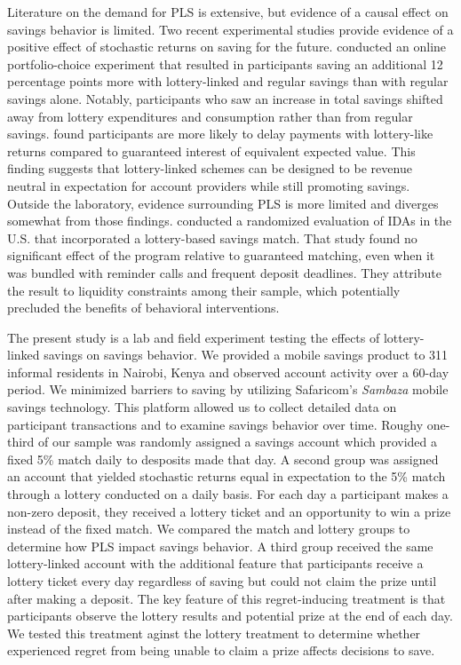 \documentclass[11pt]{article}
\begin{document}
	Literature on the demand for PLS is extensive, but evidence of a causal effect on savings behavior is limited. Two recent experimental studies provide evidence of a positive effect of stochastic returns on saving for the future.  conducted an online portfolio-choice experiment that resulted in participants saving an additional 12 percentage points more with lottery-linked and regular savings than with regular savings alone. Notably, participants who saw an increase in total savings shifted away from lottery expenditures and consumption rather than from regular savings.  found participants are more likely to delay payments with lottery-like returns compared to guaranteed interest of equivalent expected value. This finding suggests that lottery-linked schemes can be designed to be revenue neutral in expectation for account providers while still promoting savings. Outside the laboratory, evidence surrounding PLS is more limited and diverges somewhat from those findings.  conducted a randomized evaluation of IDAs in the U.S. that incorporated a lottery-based savings match. That study found no significant effect of the program relative to guaranteed matching, even when it was bundled with reminder calls and frequent deposit deadlines. They attribute the result to liquidity constraints among their sample, which potentially precluded the benefits of behavioral interventions.


	The present study is a lab and field experiment testing the effects of lottery-linked savings on savings behavior. We provided a mobile savings product to 311 informal residents in Nairobi, Kenya and observed account activity over a 60-day period. We minimized barriers to saving by utilizing Safaricom's \textit{Sambaza} mobile savings technology. This platform allowed us to collect detailed data on participant transactions and to examine savings behavior over time. Roughy one-third of our sample was randomly assigned a savings account which provided a fixed 5\% match daily to desposits made that day. A second group was assigned an account that yielded stochastic returns equal in expectation to the 5\% match through a lottery conducted on a daily basis. For each day a participant makes a non-zero deposit, they received a lottery ticket and an opportunity to win a prize instead of the fixed match. We compared the match and lottery groups to determine how PLS impact savings behavior. A third group received the same lottery-linked account with the additional feature that participants receive a lottery ticket every day regardless of saving but could not claim the prize until after making a deposit. The key feature of this regret-inducing treatment is that participants observe the lottery results and potential prize at the end of each day. We tested this treatment aginst the lottery treatment to determine whether experienced regret from being unable to claim a prize affects decisions to save.
\end{document}
